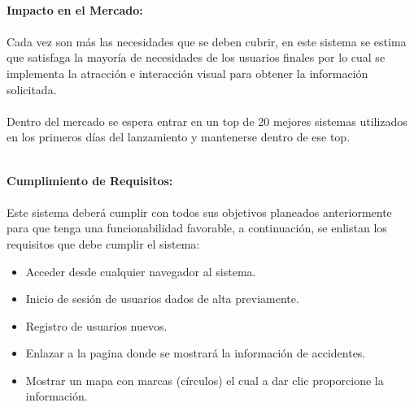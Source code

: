 \documentclass[40pt]{article}
\begin{document}
\maketitle
\textsf{\ \\
\textbf{Impacto en el Mercado:} \\
\\
Cada vez son más las necesidades que se deben cubrir, en este sistema se estima que satisfaga la mayoría de necesidades de los usuarios finales por lo cual se implementa la atracción e interacción visual para obtener la información solicitada.\\
\\
Dentro del mercado se espera entrar en un top de 20 mejores sistemas utilizados en los primeros días del lanzamiento y mantenerse dentro de ese top. 
 \\}
 
\maketitle
\textsf{\ \\
\textbf{Cumplimiento de Requisitos:} \\
\\
Este sistema deberá cumplir con todos sus objetivos planeados anteriormente para que tenga una funcionabilidad favorable, a continuación, se enlistan los requisitos que debe cumplir el sistema: \\} 
\begin{itemize}
    \item Acceder desde cualquier navegador al sistema.
    \item Inicio de sesión de usuarios dados de alta previamente. 
    \item Registro de usuarios nuevos.
    \item Enlazar a la pagina donde se mostrará la información de accidentes.
    \item Mostrar un mapa con marcas (círculos) el cual a dar clic proporcione la información.   
\end{itemize}
\end{document}

